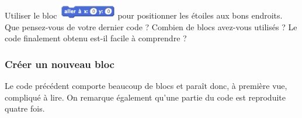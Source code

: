 \vspace{16pt}

Utiliser le bloc \includegraphics[width=2.5cm]{./images/scratch03/fonction/Scratch_Fonctions_04} pour positionner les étoiles aux bons endroits.
Que pensez-vous de votre dernier code ? Combien de blocs avez-vous utilisés ? Le code finalement obtenu est-il facile à comprendre ?

\vspace{16pt}

\subsubsection{Créer un nouveau bloc}

\vspace{12pt}

Le code précédent comporte beaucoup de blocs et paraît donc, à première vue, compliqué à lire. On remarque également qu’une partie du code est reproduite quatre fois.

\vfill
\phantom{rien}



\vspace{1cm}

